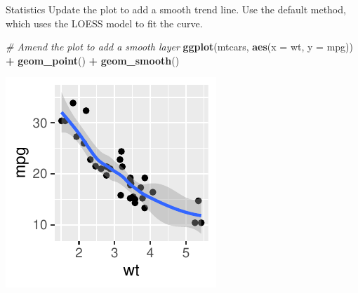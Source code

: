 \documentclass[
  ignorenonframetext,
]{beamer}
\newenvironment{Shaded}{\begin{snugshade}}{\end{snugshade}}
\newcommand{\AttributeTok}[1]{\textcolor[rgb]{0.13,0.29,0.53}{#1}}
\newcommand{\CommentTok}[1]{\textcolor[rgb]{0.56,0.35,0.01}{\textit{#1}}}
\newcommand{\FunctionTok}[1]{\textcolor[rgb]{0.13,0.29,0.53}{\textbf{#1}}}
\newcommand{\NormalTok}[1]{#1}
\newcommand{\SpecialCharTok}[1]{\textcolor[rgb]{0.81,0.36,0.00}{\textbf{#1}}}
\begin{document}
\begin{frame}[fragile]{Statistics}
\label{statistics-6}
Update the plot to add a smooth trend line. Use the default method,
which uses the LOESS model to fit the curve.


\begin{Shaded}
\begin{Highlighting}[]
\CommentTok{\# Amend the plot to add a smooth layer}
\FunctionTok{ggplot}\NormalTok{(mtcars, }\FunctionTok{aes}\NormalTok{(}\AttributeTok{x =}\NormalTok{ wt, }\AttributeTok{y =}\NormalTok{ mpg)) }\SpecialCharTok{+} \FunctionTok{geom\_point}\NormalTok{() }\SpecialCharTok{+} \FunctionTok{geom\_smooth}\NormalTok{()}
\end{Highlighting}
\end{Shaded}

\begin{center}\includegraphics[width=0.5\linewidth]{Figs/unnamed-chunk-3-1} \end{center}
\end{frame}
\end{document}
